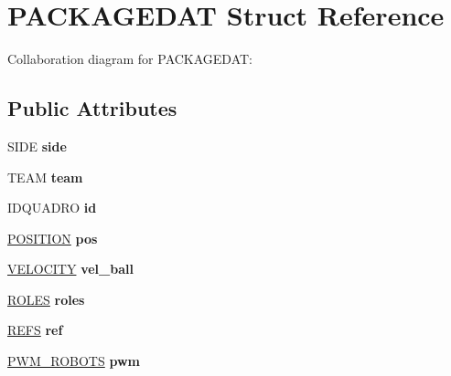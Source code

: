 \hypertarget{structPACKAGEDAT}{}\section{P\+A\+C\+K\+A\+G\+E\+D\+AT Struct Reference}
\label{structPACKAGEDAT}


Collaboration diagram for P\+A\+C\+K\+A\+G\+E\+D\+AT\+:
\subsection*{Public Attributes}
\begin{DoxyCompactItemize}
\item 
S\+I\+DE {\bfseries side}\hypertarget{structPACKAGEDAT_a777e4f80202ee03ecbda2be282c2ba13}{}\label{structPACKAGEDAT_a777e4f80202ee03ecbda2be282c2ba13}

\item 
T\+E\+AM {\bfseries team}\hypertarget{structPACKAGEDAT_a5d7161c3997713868872a73fd7625008}{}\label{structPACKAGEDAT_a5d7161c3997713868872a73fd7625008}

\item 
I\+D\+Q\+U\+A\+D\+RO {\bfseries id}\hypertarget{structPACKAGEDAT_ac27057c95877e9312321d8ec5ffefe8a}{}\label{structPACKAGEDAT_ac27057c95877e9312321d8ec5ffefe8a}

\item 
\hyperlink{structPOSITION}{P\+O\+S\+I\+T\+I\+ON} {\bfseries pos}\hypertarget{structPACKAGEDAT_a61e121b75ef1d2e6bee10919c40cf314}{}\label{structPACKAGEDAT_a61e121b75ef1d2e6bee10919c40cf314}

\item 
\hyperlink{structVELOCITY}{V\+E\+L\+O\+C\+I\+TY} {\bfseries vel\+\_\+ball}\hypertarget{structPACKAGEDAT_a104a12a69c56ad2a689cdebf070845d0}{}\label{structPACKAGEDAT_a104a12a69c56ad2a689cdebf070845d0}

\item 
\hyperlink{structROLES}{R\+O\+L\+ES} {\bfseries roles}\hypertarget{structPACKAGEDAT_ae67f4047455f86c89fcfcf4ea03a87ae}{}\label{structPACKAGEDAT_ae67f4047455f86c89fcfcf4ea03a87ae}

\item 
\hyperlink{structREFS}{R\+E\+FS} {\bfseries ref}\hypertarget{structPACKAGEDAT_a7c7b70035ce5923e30520f618271ca19}{}\label{structPACKAGEDAT_a7c7b70035ce5923e30520f618271ca19}

\item 
\hyperlink{structPWM__ROBOTS}{P\+W\+M\+\_\+\+R\+O\+B\+O\+TS} {\bfseries pwm}\hypertarget{structPACKAGEDAT_a6aebda41c1e22fb41ec605f233e00894}{}\label{structPACKAGEDAT_a6aebda41c1e22fb41ec605f233e00894}


\end{DoxyCompactItemize}
